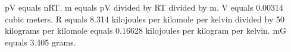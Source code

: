 pV equals nRT.  
m equals pV divided by RT divided by m.  
V equals 0.00314 cubic meters.  
R equals 8.314 kilojoules per kilomole per kelvin divided by 50 kilograms per kilomole equals 0.16628 kilojoules per kilogram per kelvin.  
mG equals 3.405 grams.